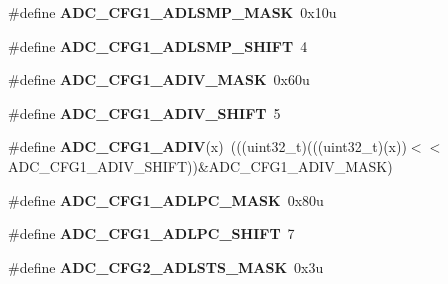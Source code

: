 \begin{DoxyCompactItemize}
\item 
\#define {\bfseries A\+D\+C\+\_\+\+C\+F\+G1\+\_\+\+A\+D\+L\+S\+M\+P\+\_\+\+M\+A\+SK}~0x10u\hypertarget{group__ADC__Register__Masks_ga3f96490246c5bef5f9ccede781423b22}{}\label{group__ADC__Register__Masks_ga3f96490246c5bef5f9ccede781423b22}

\item 
\#define {\bfseries A\+D\+C\+\_\+\+C\+F\+G1\+\_\+\+A\+D\+L\+S\+M\+P\+\_\+\+S\+H\+I\+FT}~4\hypertarget{group__ADC__Register__Masks_gab2cd2b0ee8a3e6c0e3710e5477ba4f25}{}\label{group__ADC__Register__Masks_gab2cd2b0ee8a3e6c0e3710e5477ba4f25}

\item 
\#define {\bfseries A\+D\+C\+\_\+\+C\+F\+G1\+\_\+\+A\+D\+I\+V\+\_\+\+M\+A\+SK}~0x60u\hypertarget{group__ADC__Register__Masks_gaffbe8246d864b7889a3ce04b94e6d948}{}\label{group__ADC__Register__Masks_gaffbe8246d864b7889a3ce04b94e6d948}

\item 
\#define {\bfseries A\+D\+C\+\_\+\+C\+F\+G1\+\_\+\+A\+D\+I\+V\+\_\+\+S\+H\+I\+FT}~5\hypertarget{group__ADC__Register__Masks_gacbe42773bc1f15c2870c2422c89bfe67}{}\label{group__ADC__Register__Masks_gacbe42773bc1f15c2870c2422c89bfe67}

\item 
\#define {\bfseries A\+D\+C\+\_\+\+C\+F\+G1\+\_\+\+A\+D\+IV}(x)~(((uint32\+\_\+t)(((uint32\+\_\+t)(x))$<$$<$A\+D\+C\+\_\+\+C\+F\+G1\+\_\+\+A\+D\+I\+V\+\_\+\+S\+H\+I\+FT))\&A\+D\+C\+\_\+\+C\+F\+G1\+\_\+\+A\+D\+I\+V\+\_\+\+M\+A\+SK)\hypertarget{group__ADC__Register__Masks_ga7407a87e3d32012930901336c97b7694}{}\label{group__ADC__Register__Masks_ga7407a87e3d32012930901336c97b7694}

\item 
\#define {\bfseries A\+D\+C\+\_\+\+C\+F\+G1\+\_\+\+A\+D\+L\+P\+C\+\_\+\+M\+A\+SK}~0x80u\hypertarget{group__ADC__Register__Masks_ga308bdf4f339315924bd36b1f2aa3d254}{}\label{group__ADC__Register__Masks_ga308bdf4f339315924bd36b1f2aa3d254}

\item 
\#define {\bfseries A\+D\+C\+\_\+\+C\+F\+G1\+\_\+\+A\+D\+L\+P\+C\+\_\+\+S\+H\+I\+FT}~7\hypertarget{group__ADC__Register__Masks_ga15e7cf514347ab7f32e2104b1776704e}{}\label{group__ADC__Register__Masks_ga15e7cf514347ab7f32e2104b1776704e}

\item 
\#define {\bfseries A\+D\+C\+\_\+\+C\+F\+G2\+\_\+\+A\+D\+L\+S\+T\+S\+\_\+\+M\+A\+SK}~0x3u\hypertarget{group__ADC__Register__Masks_ga99f0b4983922eca1e6ed86d053fe41db}{}\label{group__ADC__Register__Masks_ga99f0b4983922eca1e6ed86d053fe41db}


\end{DoxyCompactItemize}
